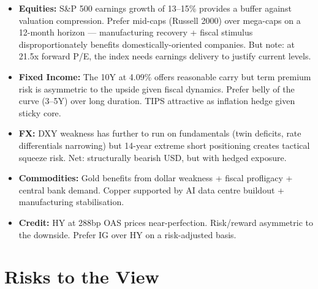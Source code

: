 \documentclass{wilson-report}
\begin{document}
\begin{itemize}[leftmargin=1.2em, itemsep=4pt]
  \item \textbf{Equities:} S\&P 500 earnings growth of 13--15\% provides a buffer against valuation compression. Prefer mid-caps (Russell 2000) over mega-caps on a 12-month horizon --- manufacturing recovery + fiscal stimulus disproportionately benefits domestically-oriented companies. But note: at 21.5x forward P/E, the index needs earnings delivery to justify current levels.
  \item \textbf{Fixed Income:} The 10Y at 4.09\% offers reasonable carry but term premium risk is asymmetric to the upside given fiscal dynamics. Prefer belly of the curve (3--5Y) over long duration. TIPS attractive as inflation hedge given sticky core.
  \item \textbf{FX:} DXY weakness has further to run on fundamentals (twin deficits, rate differentials narrowing) but 14-year extreme short positioning creates tactical squeeze risk. Net: structurally bearish USD, but with hedged exposure.
  \item \textbf{Commodities:} Gold benefits from dollar weakness + fiscal profligacy + central bank demand. Copper supported by AI data centre buildout + manufacturing stabilisation.
  \item \textbf{Credit:} HY at 288bp OAS prices near-perfection. Risk/reward asymmetric to the downside. Prefer IG over HY on a risk-adjusted basis.
\end{itemize}

\section{Risks to the View}
\end{document}
